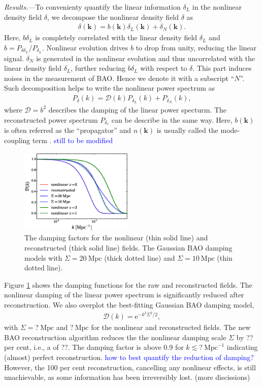 \documentclass[aps,prd,twocolumn,showpacs,superscriptaddress,groupedaddress,nofootinbib]{revtex4}  %
\newcommand{\mr}{\mathrm}
\newcommand{\tcb}{\textcolor{blue}}
\newcommand{\bea}{\begin{eqnarray}}
\newcommand{\eea}{\end{eqnarray}}
\begin{document}
{\it Results.}---To convenienty quantify the linear information $\delta_L$ in 
the nonlinear density field $\delta$, we decompose the nonlinear density field
$\delta$ as
\begin{eqnarray}
\delta(\bm{k})=b(\bm{k})\delta_L(\bm{k})+\delta_N(\bm{k}).
\end{eqnarray}
Here, $b\delta_L$ is completely correlated with the linear density field 
$\delta_L$ and $b=P_{\delta\delta_L}/P_{\delta_L}$.
Nonlinear evolution drives $b$ to drop from unity, reducing the linear signal.
$\delta_N$ is generated in the nonlinear evolution and thus uncorrelated with
the linear density field $\delta_L$, further reducing $b\delta_L$ with respect
to $\delta$. This part induces noises in the measurement of BAO. 
Hence we denote it with a subscript ``$N$''. 
Such decomposition helps to write the nonlinear power spectrum as
\bea
P_\delta(k)=\mathcal{D}(k)P_{\delta_L}(k)+P_{\delta_N}(k),
\eea
where $\mathcal{D}=b^2$ describes the damping of the linear power specturm.
The reconstructed power spectrum $P_{\delta_r}$ can be describe in the same way.
Here, $b(\bm{k})$ is often referred as the ``propagator'' 
and $n(\bm{k})$ is usually
called the mode-coupling term \cite{2006crocce,2008crocce,2008matsubara}.
\tcb{still to be modified}

\begin{figure}[tbp]
\begin{center}
\includegraphics[width=0.48\textwidth]{f6x.eps}
\end{center}
\vspace{-0.7cm}
\caption{The damping factors for the nonlinear (thin solid line) and 
reconstructed (thick solid line) fields. The Gaussian BAO damping models with 
$\Sigma=20\ \mr{Mpc}$ (thick dotted line) and $\Sigma=10\ \mr{Mpc}$ (thin dotted
line).}
\label{fig:damp}
\end{figure}

Figure \ref{fig:damp} shows the damping functions for the raw and reconstructed 
fields. The nonlinear damping of the linear power spectrum is 
significantly reduced after reconstruction. We also overplot the best-fitting 
Gaussian BAO damping model,
\bea
\mathcal{D}(k)=\mr{e}^{-k^2\Sigma^2/2},
\eea
with $\Sigma=?\ \mr{Mpc}$ and $?\ \mr{Mpc}$ for the nonlinear and reconstructed 
fields. The new BAO reconstruction algorithm reduces the the nonlinear damping
scale $\Sigma$ by ?? per cent, i.e., a of ??. The damping factor is above 0.9
for $k\lesssim?\ \mr{Mpc}^{-1}$ indicating (almost) perfect reconstruction. 
\tcb{how to best quantify the reduction of damping? }
However, the 100 per cent reconstruction, cancelling any nonlinear effects,
is still unachievable, as some information has been irreversibly lost. (more 
discissions)
\end{document}

